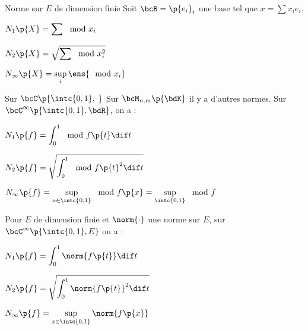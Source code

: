 \documentclass[a4paper,french,bookmarks]{book}
\begin{document}
    \begin{example}{Norme sur $E$ de dimension finie}{}
        Soit $\bcB = \p{e_i}_i$ une base tel que $x = \displaystyle\sum x_ie_i$.
        \begin{enumerate}
            \itt $\displaystyle N_1\p{X} = \sum \mod{x_i}$
            
            \itt $\displaystyle N_2\p{X} = \sqrt{\sum \mod{x_i}^2}$
            
            \itt $\displaystyle N_\infty\p{X} = \sup\limits_i\ens{\mod{x_i}}$
        \end{enumerate}
    \end{example}
    
    \begin{example}{Sur $\bcC\p{\intc{0, 1}, \cdot}$}{}
        Sur $\bcM_{n, m}\p{\bdK}$ il y a d'autres normes. Sur $\bcC^\infty \p{\intc{0, 1}, \bdR}$, on a :
        \begin{enumerate}
            \itt $N_1\p{f} = \displaystyle\int_0^1 \mod{f\p{t}} \dif t$
            
            \itt $N_2\p{f} = \sqrt{\displaystyle\int_0^1 \mod{f\p{t}}^2\dif t}$
            
            \itt $N_\infty\p{f} = \sup\limits_{x \in \intc{0, 1}} \mod{f\p{x}} = \sup\limits_{\intc{0, 1}} \mod{f}$
        \end{enumerate}
        Pour $E$ de dimension finie et $\norm{\cdot}$ une norme sur $E$, sur $\bcC^\infty \p{\intc{0, 1}, E}$ on a :
        \begin{enumerate}
            \itt $N_1\p{f} = \displaystyle\int_0^1 \norm{f\p{t}}\dif t$
            
            \itt $N_2\p{f} = \sqrt{\displaystyle\int_0^1 \norm{f\p{t}}^2\dif t}$
            
            \itt $N_\infty\p{f} = \sup\limits_{x \in \intc{0, 1}} \norm{f\p{x}}$
        \end{enumerate}
    \end{example}
    
\end{document}
